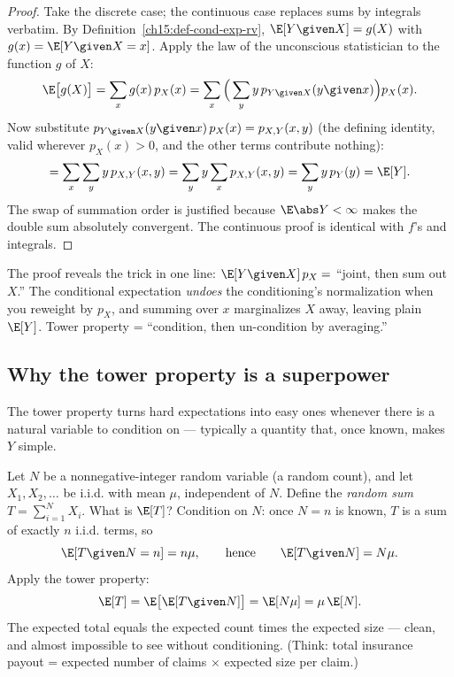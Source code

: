\begin{proof}
Take the discrete case; the continuous case replaces sums by integrals verbatim. By
Definition~\ref{ch15:def-cond-exp-rv}, $\E[Y\given X] = g(X)$ with $g(x) = \E[Y\given X = x]$. Apply the
law of the unconscious statistician to the function $g$ of $X$:
\[
  \E\big[g(X)\big] = \sum_x g(x)\,p_X(x)
  = \sum_x \Big(\sum_y y\, p_{Y\given X}(y\given x)\Big) p_X(x).
\]
Now substitute $p_{Y\given X}(y\given x)\,p_X(x) = p_{X,Y}(x,y)$ (the defining identity, valid wherever
$p_X(x)>0$, and the other terms contribute nothing):
\[
  = \sum_x \sum_y y \, p_{X,Y}(x,y)
  = \sum_y y \sum_x p_{X,Y}(x,y)
  = \sum_y y \, p_Y(y) = \E[Y].
\]
The swap of summation order is justified because $\E\abs Y < \infty$ makes the double sum absolutely
convergent. The continuous proof is identical with $f$'s and integrals.
\end{proof}

\begin{happeningbox}
The proof reveals the trick in one line: $\E[Y\given X]\,p_X = $ ``joint, then sum out $X$.'' The
conditional expectation \emph{undoes} the conditioning's normalization when you reweight by $p_X$, and
summing over $x$ marginalizes $X$ away, leaving plain $\E[Y]$. Tower property = ``condition, then
un-condition by averaging.''
\end{happeningbox}

\subsection{Why the tower property is a superpower}
The tower property turns hard expectations into easy ones whenever there is a natural variable to
condition on --- typically a quantity that, once known, makes $Y$ simple.

\begin{example}
\label{ch15:ex-random-sum}
Let $N$ be a nonnegative-integer random variable (a random count), and let $X_1, X_2, \dots$ be i.i.d.
with mean $\mu$, independent of $N$. Define the \emph{random sum} $T = \sum_{i=1}^{N} X_i$. What is
$\E[T]$? Condition on $N$: once $N = n$ is known, $T$ is a sum of exactly $n$ i.i.d. terms, so
\[
  \E[T \given N = n] = n\mu, \qquad\text{hence}\qquad \E[T\given N] = N\mu.
\]
Apply the tower property:
\[
  \E[T] = \E\big[\E[T\given N]\big] = \E[N\mu] = \mu\,\E[N].
\]
The expected total equals the expected count times the expected size --- clean, and almost impossible
to see without conditioning. (Think: total insurance payout = expected number of claims $\times$
expected size per claim.)
\end{example}

